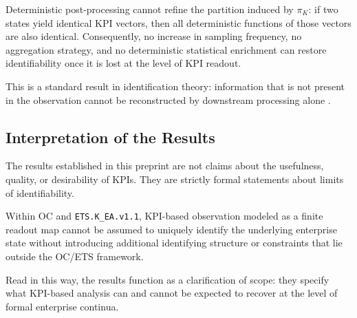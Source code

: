 Deterministic post-processing cannot refine the partition induced by
\(\pi_K\):
if two states yield identical KPI vectors, then all deterministic functions of
those vectors are also identical.
Consequently, no increase in sampling frequency, no aggregation strategy, and no
deterministic statistical enrichment can restore identifiability once it is lost
at the level of KPI readout.

This is a standard result in identification theory: information that is not
present in the observation cannot be reconstructed by downstream processing
alone \cite{ljung1999,walter1982}.

\subsection{Interpretation of the Results}

The results established in this preprint are not claims about the usefulness,
quality, or desirability of KPIs.
They are strictly formal statements about limits of identifiability.

Within OC and \texttt{ETS.K\_EA.v1.1}, KPI-based observation modeled as a finite
readout map cannot be assumed to uniquely identify the underlying enterprise
state without introducing additional identifying structure or constraints that
lie outside the OC/ETS framework.

Read in this way, the results function as a clarification of scope: they specify
what KPI-based analysis can and cannot be expected to recover at the level of
formal enterprise continua.
